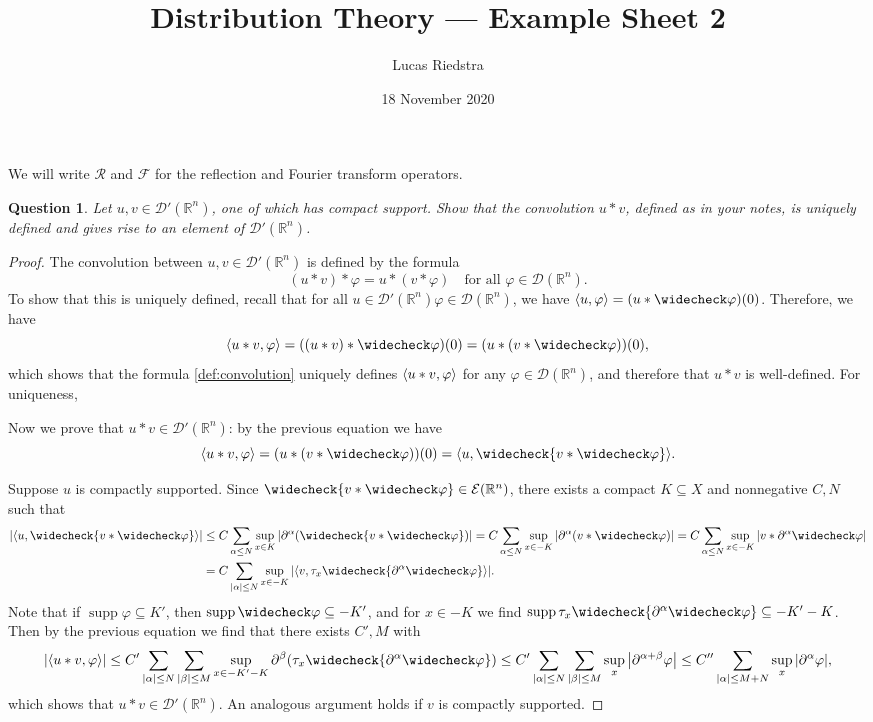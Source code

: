 \documentclass{article}
\title{Distribution Theory --- Example Sheet 2} %
\author{Lucas Riedstra}
\date{18 November 2020} %
\theoremstyle{plain}
\newtheorem{question}{Question}
\theoremstyle{remark}
\renewcommand{\phi}{\varphi}
\newcommand{\Bb}{\mathbb}
\newcommand{\Cal}{\mathcal}
\newcommand{\RR}{\Bb R}
\newcommand{\DD}{\Cal D}
\newcommand\EE{\Cal E}
\newcommand\FF{\Cal F}
\newcommand\Rr{\Cal R}
\DeclarePairedDelimiter{\ang}{\langle}{\rangle}
\newcommand\pt\partial
\newcommand\refl\widecheck
\DeclareMathOperator{\supp}{supp}
\begin{document}
\maketitle

\begin{mdframed}
	We will write $\Rr$ and $\FF$ for the reflection and Fourier transform operators. 
\end{mdframed}
\begin{question}
Let $u, v \in \DD'(\RR^n)$, one of which has compact support. Show that the convolution $u * v$, defined as in your notes, is uniquely defined and gives rise to an element of $\DD'(\RR^n)$. 
\end{question}

\begin{proof}
	The convolution between $u, v \in \DD'(\RR^n)$ is defined by the formula
	\begin{equation} \label{def:convolution}
	(u * v) * \phi = u * (v * \phi) \quad\text{for all $\phi \in \DD(\RR^n)$}. 
	\end{equation}
	To show that this is uniquely defined, recall that for all $u \in \DD'(\RR^n) \phi\in \DD(\RR^n)$, we have $\ang{u, \phi} = (u * \refl\phi)(0)$. Therefore, we have
	\[
	\ang{u * v, \phi} = ((u * v) * \refl\phi)(0) = (u * (v * \refl\phi))(0),
	\]
	which shows that the formula \cref{def:convolution} uniquely defines $\ang{u * v, \phi}$ for any $\phi \in \DD(\RR^n)$, and therefore that $u * v$ is well-defined. For uniqueness, 
	
	Now we prove that $u * v \in \DD'(\RR^n)$: by the previous equation we have
	\[
	\ang{u * v, \phi} = (u * (v * \refl\phi))(0) = \ang{u, \refl{v * \refl\phi}}.
	\]
	
	Suppose $u$ is compactly supported. Since $\refl{v * \refl\phi} \in \EE(\RR^n)$, there exists a compact $K \subseteq X$ and nonnegative $C, N$ such that
	\begin{align*}
		\abs{\ang{u, \refl{v * \refl\phi}}} &\leq C \sum_{\alpha \leq N} \sup_{x \in K} \abs{\pt^\alpha (\refl{v * \refl\phi})} = C \sum_{\alpha \leq N} \sup_{x \in -K} \abs{\pt^\alpha (v * \refl\phi)} = C \sum_{\alpha \leq N} \sup_{x \in -K} \abs{v * \pt^\alpha\refl\phi}\\
		&= C \sum_{\abs{\alpha} \leq N} \sup_{x \in -K} \abs{\ang{v, \tau_x \refl{\pt^\alpha \refl\phi}}}.
	\end{align*}
	Note that if $\supp\phi \subseteq K'$, then $\supp\refl\phi \subseteq -K'$, and for $x \in -K$ we find $\supp \tau_x \refl{\pt^\alpha \refl\phi} \subseteq -K' -K$. Then by the previous equation we find that there exists $C', M$ with
	\[
	\abs{\ang{u * v, \phi}} \leq C' \sum_{\abs{\alpha} \leq N} \sum_{\abs{\beta} \leq M} \sup_{x \in -K' - K} \pt^\beta (\tau_x \refl{\pt^\alpha \refl\phi}) \leq C' \sum_{\abs{\alpha} \leq N} \sum_{\abs{\beta} \leq M} \sup_x \abs{\pt^{\alpha + \beta} \phi} \leq C'' \sum_{\abs{\alpha} \leq M + N} \sup_x \abs{\pt^\alpha \phi},
	\]
	which shows that $u* v \in \DD'(\RR^n)$. An analogous argument holds if $v$ is compactly supported. 
\end{proof}
\end{document}
